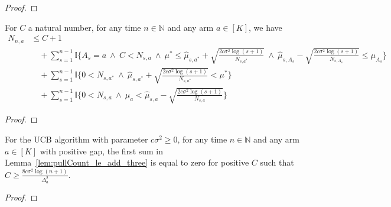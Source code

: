 \begin{proof}\leanok

\end{proof}


\begin{lemma}\label{lem:pullCount_le_add_three}
  \leanok
For $C$ a natural number, for any time $n \in \mathbb{N}$ and any arm $a \in [K]$, we have
\begin{align*}
  N_{n,a}
  &\le C + 1
  \\&\quad +
      \sum_{s=1}^{n-1} \mathbb{I}\{A_s = a \ \wedge \ C < N_{s,a} \ \wedge \
        \mu^* \le \hat{\mu}_{s, a^*} + \sqrt{\frac{2 c \sigma^2 \log(s + 1)}{N_{s,a^*}}} \ \wedge \
        \hat{\mu}_{s, A_s} - \sqrt{\frac{2 c \sigma^2 \log(s + 1)}{N_{s,A_s}}} \le \mu_{A_s}\}
  \\&\quad +
      \sum_{s=1}^{n-1}
        \mathbb{I}\{0 < N_{s, a^*} \ \wedge \ \hat{\mu}_{s, a^*} + \sqrt{\frac{2 c \sigma^2 \log(s + 1)}{N_{s,a^*}}} <
          \mu^*\}
  \\&\quad +
      \sum_{s=1}^{n-1}
        \mathbb{I}\{0 < N_{s, a} \ \wedge \ \mu_a <
          \hat{\mu}_{s, a} - \sqrt{\frac{2 c \sigma^2 \log(s + 1)}{N_{s,a}}}\}
\end{align*}
\end{lemma}

\begin{proof}\leanok

\end{proof}


\begin{lemma}\label{lem:some_sum_eq_zero}
  \leanok
For the UCB algorithm with parameter $c \sigma^2 \ge 0$, for any time $n \in \mathbb{N}$ and any arm $a \in [K]$ with positive gap, the first sum in Lemma~\ref{lem:pullCount_le_add_three} is equal to zero for positive $C$ such that $C \ge \frac{8 c \sigma^2 \log(n + 1)}{\Delta_a^2}$.
\end{lemma}

\begin{proof}\leanok

\end{proof}



